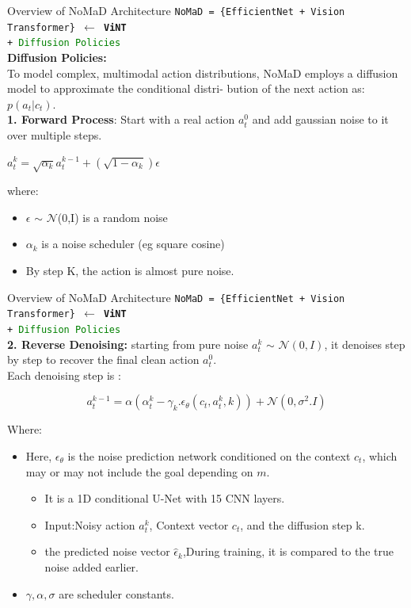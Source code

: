 \documentclass{beamer}
\begin{document}
\begin{frame}{Overview of NoMaD Architecture}
    \texttt{NoMaD = \{EfficientNet + Vision Transformer\} $\leftarrow$ \textbf{ViNT} \\+ \textcolor{green}{Diffusion Policies}}\\
    \textbf{Diffusion Policies:}\\
    To model complex, multimodal action distributions, NoMaD employs a diffusion model to approximate the conditional distri-
    bution of the next action as: $p(a_t|c_t)$.\\
    \textbf{1. Forward Process}: Start with a real action $a^{0}_t$ and add gaussian noise to it over multiple steps.
        \begin{center}
            $a^{k}_t = \sqrt{\alpha_k} a^{k-1}_t + (\sqrt{1 - \alpha_k}) \epsilon$
        \end{center}
        where:\\
    \begin{itemize}
        \item $\epsilon$ $\sim$ $\mathcal{N}$(0,I) is a random noise
        \item $\alpha_k$ is a noise scheduler (eg square cosine)
        \item By step K, the action is almost pure noise.
    \end{itemize}
\end{frame}
\begin{frame}{Overview of NoMaD Architecture}
    \texttt{NoMaD = \{EfficientNet + Vision Transformer\} $\leftarrow$ \textbf{ViNT} \\+ \textcolor{green}{Diffusion Policies}}\\
    \textbf{2. Reverse Denoising:} starting from pure noise $a^{k}_t$ $\sim$ $\mathcal{N}(0,I)$, it denoises step by step to recover the final clean action $a^{0}_t$.\\
    Each denoising step is :
    \begin{center}
        \[a^{k-1}_t = \alpha(\alpha^{k}_t-\gamma_k.\epsilon_{\theta}(c_t, a^{k}_t,k)) + \mathcal{N}(0,\sigma^2.I)\]
    \end{center}
    Where:
    \begin{itemize}
        \item Here, $\epsilon_\theta$ is the noise prediction network conditioned on the context $c_t$, which may or may not include the goal depending on $m$.
        \begin{itemize}
            \item It is a 1D conditional U-Net with 15 CNN layers.
            \item Input:Noisy action $a^{k}_t$, Context vector $c_t$, and the diffusion step k.
            \item the predicted noise vector $\hat{\epsilon}_k$,During training, it is compared to the true noise added earlier.
        \end{itemize}
        \item $\gamma, \alpha ,\sigma$ are scheduler constants.
    \end{itemize}
     
\end{frame}
\end{document}
